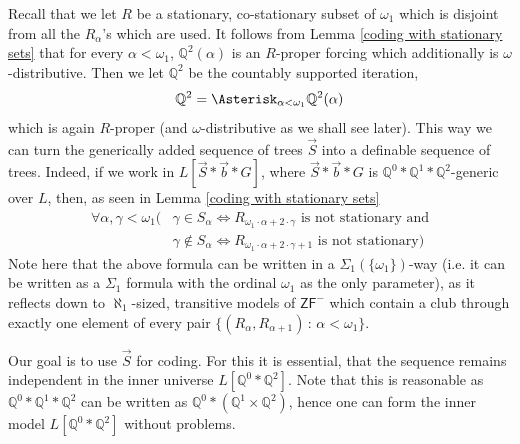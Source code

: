 \documentclass[a4paper,11pt]{article}
\newcommand{\forceQ}{\mathbb{Q}}
\newcommand{\ZFP}{\mathsf{ZF}^-}
\begin{document}
Recall that we let $R$ be a stationary, co-stationary subset of $\omega_1$ which is disjoint from all the $R_{\alpha}$'s which are used. It follows from Lemma \ref{coding with stationary sets} that for every $\alpha < \omega_1$, $\forceQ^2 (\alpha)$ is an $R$-proper forcing which additionally is $\omega$-distributive.  Then we let $\mathbb{Q}^2$ be the countably supported iteration, $$\mathbb{Q}^2=\Asterisk_{\alpha< \omega_1} \forceQ^2 (\alpha)$$ which is again $R$-proper (and $\omega$-distributive as we shall see later).
This way we can turn the generically added sequence of trees $\vec{S}$ into a definable sequence of trees.
Indeed, if we work in $L[\vec{S}\ast \vec{b} \ast G]$, where $\vec{S} \ast\vec{b} \ast  G$ is $\forceQ^0 \ast \mathbb{Q}^1 \ast \forceQ^2$-generic over $L$, then, as seen in Lemma \ref{coding with stationary sets} 
\begin{align*}
\forall \alpha, \gamma < \omega_1 (&\gamma \in S_{\alpha} \Leftrightarrow R_{\omega_1 \cdot \alpha + 2 \cdot \gamma} \text{ is not stationary and} \\ &
\gamma \notin S_{\alpha} \Leftrightarrow  R_{\omega_1 \cdot \alpha + 2 \cdot \gamma +1} \text{ is not stationary})
\end{align*}
Note here that the above formula can be written in a $\Sigma_1(\{\omega_1\} )$-way (i.e. it can be written as a $\Sigma_1$ formula with the ordinal $\omega_1$ as the only parameter), as  it reflects down to $\aleph_1$-sized, transitive models of $\ZFP$ which contain a club through exactly one element of every pair $\{(R_{\alpha}, R_{\alpha+1}) \, : \, \alpha < \omega_1\}$.


Our goal is to use $\vec{S}$ for coding. For this it is essential, that the sequence remains independent in the inner  universe $L[\forceQ^0 \ast \forceQ^2]$. Note that this is reasonable as $\forceQ^0 \ast \forceQ^1 \ast \forceQ^2$ can be written as $\forceQ^0 \ast ( \forceQ^1 \times \forceQ^2)$, hence one can form the inner model $L[\forceQ^0 \ast \forceQ^2]$ without problems.
\end{document}
